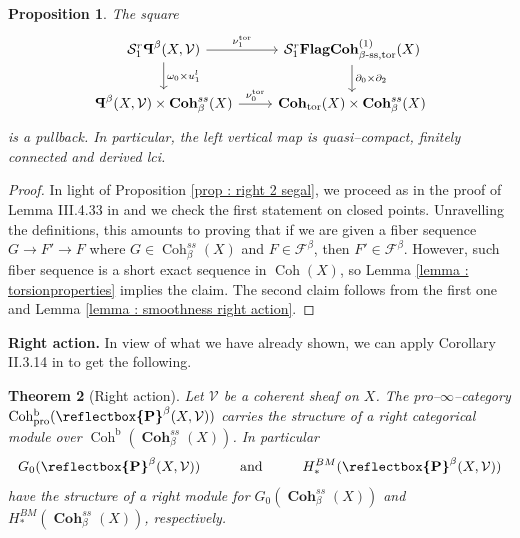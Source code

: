 \documentclass[11pt]{article}
\newtheorem{theorem}{Theorem}
\newtheorem{proposition}[theorem]{Proposition}
\newcommand{\pro}{\operatorname{Coh^b_{pro}}}
\newcommand{\segal}{\mathcal{S}}
\newcommand{\fbeta}{\mathcal{F}^{\beta}}
\newcommand{\tbetastack}{\boldsymbol{\operatorname{Coh}}_{\operatorname{tor}}(X)}
\newcommand{\coh}{\operatorname{Coh}}
\newcommand{\cohbetass}{\operatorname{Coh}^{ss}_{\beta}(X)}
\newcommand{\cohbetassstack}{\boldsymbol{\operatorname{Coh}}^{ss}_{\beta}(X)}
\newcommand{\framing}{\mathcal{V}}
\newcommand{\copairs}{\boldsymbol{\cop}^{\beta}(X,\mathcal{V})}
\newcommand{\cop}{\reflectbox{\ensuremath{\operatorname{P}}}}
\begin{document}
  
    \begin{proposition}
        The square 
    \begin{equation}\label{eqn : right flatness square}
        \begin{tikzcd}
	{\segal_1^r \copairs} & {\segal_1^r\boldsymbol{\operatorname{FlagCoh}}^{(1)}_{\operatorname{\beta-ss,tor}}(X)} \\
	\copairs \times \cohbetassstack & \tbetastack \times \cohbetassstack
	\arrow[from=1-1, to=1-2 , "\nu_1^{\operatorname{tor}}"]
	\arrow[from=1-1, to=2-1, "\omega_0 \times u^l_1"]
	\arrow[from=1-2, to=2-2, "\partial_0 \times \partial_2"]
	\arrow[""{name=0, anchor=center, inner sep=0}, from=2-1, to=2-2, "\nu_0^{\operatorname{tor}}"]
    \end{tikzcd}
    \end{equation}
    is a pullback. In particular, the left vertical map is quasi--compact, finitely connected and derived lci.
    \end{proposition}

    \begin{proof}
    In light of Proposition \ref{prop : right 2 segal}, we proceed as in the proof of Lemma III.4.33 in \cite{dps} and we check the first statement on closed points. Unravelling the definitions, this amounts to proving that if we are given a fiber sequence $G\rightarrow F' \rightarrow F$ where $G\in \cohbetass$ and $F\in \fbeta$, then $F'\in \fbeta$. However, such fiber sequence is a short exact sequence in $\coh(X)$, so Lemma \ref{lemma : torsionproperties} implies the claim. The second claim follows from the first one and Lemma \ref{lemma : smoothness right action}.
    \end{proof}


\noindent\textbf{Right action. }In view of what we have already shown, we can apply Corollary II.3.14 in \cite{dps} to get the following.


    \begin{theorem}[Right action]\label{thm : right action}
        Let $\framing$ be a coherent sheaf on $X$. The pro--$\infty$--category $\pro(\copairs)$ carries the structure of a right categorical module over $\coh^{\operatorname{b}}(\cohbetassstack)$. In particular 
      \[
            G_0(\copairs) \hspace{1cm} \text{and} \hspace{1cm} H_*^{BM}(\copairs)
       \]
       have the structure of a right module for $G_0(\cohbetassstack)$ and $H_*^{BM}(\cohbetassstack)$, respectively.
    \end{theorem}
\end{document}
